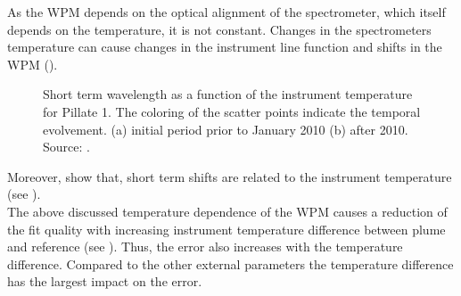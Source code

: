 As the WPM depends on the optical alignment of the spectrometer, which itself depends on the temperature, it is not constant.
Changes in the spectrometers temperature can cause changes in the instrument line function and shifts in the WPM (\citep{pinardi2007influence}). 
\begin{figure}		
	\caption{Short term wavelength as a function of the instrument temperature for Pillate 1. The coloring of the scatter points indicate the temporal evolvement. (a) initial period prior to January 2010 (b) after 2010. Source: \cite{WarnachSimon}.}
	\label{fig:shorttermshift}
\end{figure}
Moreover, \cite{WarnachSimon} show that, short term shifts are related to the instrument temperature (see ).\\
The above discussed temperature dependence of the WPM causes a reduction of the fit quality with increasing instrument temperature difference between plume and reference (see ). Thus, the  error also increases with the temperature difference.
Compared to the other external parameters the temperature difference has the largest impact on the  error.\\
\\
